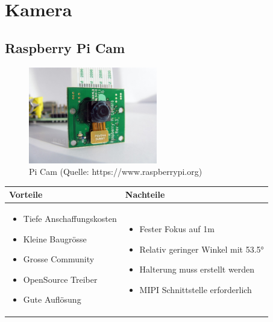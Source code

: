 
\section{Kamera}


\subsection{Raspberry Pi Cam}

\begin{figure}[h!]%
\centering
\includegraphics[width=0.5\textwidth]{fig/raspberry-pi-camera-module.jpg}
\caption{Pi Cam (Quelle: https://www.raspberrypi.org)}
\label{fig:PiCam}
\end{figure}

\begin{table}[h]
\begin{tabular}{p{} | p{}}


 \textbf{Vorteile} & \textbf{Nachteile} \\ \hline
	 
\begin{itemize}
\item Tiefe Anschaffungskosten
\item Kleine Baugrösse
\item Grosse Community
\item OpenSource Treiber
\item Gute Auflösung
\end{itemize}

 
 &
 
\begin{itemize}
\item Fester Fokus auf 1m
\item Relativ geringer Winkel mit 53.5°
\item Halterung muss erstellt werden
\item MIPI Schnittstelle erforderlich
\end{itemize}

\end{tabular}
\end{table}

